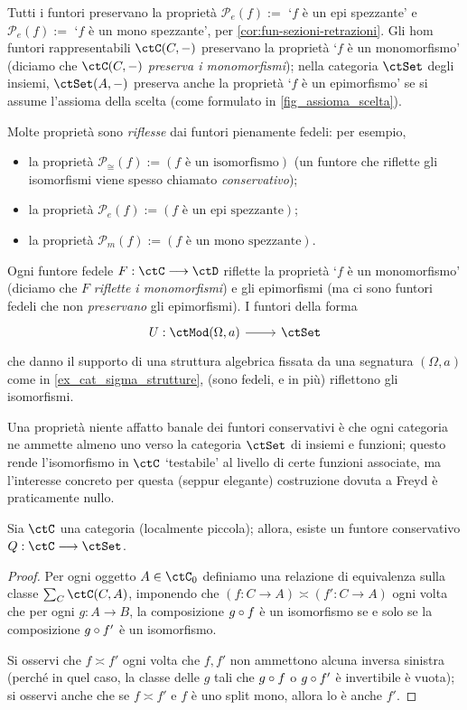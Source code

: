 \begin{proposition}\label{prop_preserva_riflette}
	Tutti i funtori preservano la proprietà \(\mathcal P_e(f) :=\) `\(f\) è un epi spezzante' e \(\mathcal P_e(f) :=\) `\(f\) è un mono spezzante', per \ref{cor:fun-sezioni-retrazioni}. Gli hom funtori rappresentabili \(\Hom\ctC(C,-)\) preservano la proprietà `\(f\) è un monomorfismo' (diciamo che \(\Hom\ctC(C,-)\) \emph{preserva i monomorfismi}); nella categoria \(\ctSet\) degli insiemi, \(\Hom\ctSet(A,-)\) preserva anche la proprietà `\(f\) è un epimorfismo' se si assume l'assioma della scelta (come formulato in \ref{fig_assioma_scelta}).

	Molte proprietà sono \emph{riflesse} dai funtori pienamente fedeli: per esempio,
	\begin{itemize}
		\item la proprietà \(\mathcal P_\cong(f) := (f \text{ è un isomorfismo})\) (un funtore che riflette gli isomorfismi viene spesso chiamato \emph{conservativo});
		\item la proprietà \(\mathcal P_e(f) := (f \text{ è un epi spezzante})\);
		\item la proprietà \(\mathcal P_m(f) := (f \text{ è un mono spezzante})\).
	\end{itemize}
	Ogni funtore fedele \(F : \ctC\fun\ctD\) riflette la proprietà `\(f\) è un monomorfismo' (diciamo che \(F\) \emph{riflette i monomorfismi}) e gli epimorfismi (ma ci sono funtori fedeli che non \emph{preservano} gli epimorfismi). I funtori della forma
	\[\dmFun{U}{\ctMod(\Omega,a)}{\ctSet}\]
	che danno il supporto di una struttura algebrica fissata da una segnatura \((\Omega,a)\) come in \ref{ex_cat_sigma_strutture}, (sono fedeli, e in più) riflettono gli isomorfismi.
\end{proposition}
Una proprietà niente affatto banale dei funtori conservativi è che ogni categoria ne ammette almeno uno verso la categoria \(\ctSet\) di insiemi e funzioni; questo rende l'isomorfismo in \(\ctC\) `testabile' al livello di certe funzioni associate, ma l'interesse concreto per questa (seppur elegante) costruzione dovuta a Freyd \cite{fconc} è praticamente nullo.
\begin{theorem}
	Sia \(\ctC\) una categoria (localmente piccola); allora, esiste un funtore conservativo \(Q : \ctC\fun\ctSet\).
\end{theorem}
\begin{proof}
	Per ogni oggetto \(A\in\ctC_0\) definiamo una relazione di equivalenza sulla classe \(\sum_C\ctC(C,A)\), imponendo che \((f : C\to A)\asymp(f' : C\to A)\) ogni volta che per ogni \(g :A\to B\), la composizione \(g\circ f\) è un isomorfismo se e solo se la composizione \(g\circ f'\) è un isomorfismo.

	Si osservi che \(f\asymp f'\) ogni volta che \(f,f'\) non ammettono alcuna inversa sinistra (perché in quel caso, la classe delle \(g\) tali che \(g\circ f\) o \(g\circ f'\) è invertibile è vuota); si osservi anche che se \(f\asymp f'\) e \(f\) è uno split mono, allora lo è anche \(f'\).
	\Todo{}
\end{proof}
